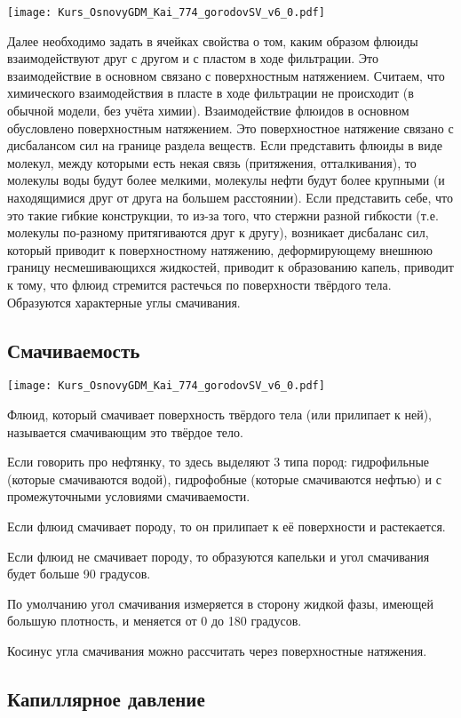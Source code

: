 \documentclass[main.tex]{subfiles}
\begin{document}
\texttt{[image: Kurs\_OsnovyGDM\_Kai\_774\_gorodovSV\_v6\_0.pdf]}

Далее необходимо задать в ячейках свойства о том, каким образом флюиды взаимодействуют друг с другом и с пластом в ходе фильтрации.
Это взаимодействие в основном связано с поверхностным натяжением.
Считаем, что химического взаимодействия в пласте в ходе фильтрации не происходит (в обычной модели, без учёта химии).
Взаимодействие флюидов в основном обусловлено поверхностным натяжением.
Это поверхностное натяжение связано с дисбалансом сил на границе раздела веществ.
Если представить флюиды в виде молекул, между которыми есть некая связь (притяжения, отталкивания), то молекулы воды будут более мелкими, молекулы нефти будут более крупными (и находящимися друг от друга на большем расстоянии).
Если представить себе, что это такие гибкие конструкции, то из-за того, что стержни разной гибкости (т.е. молекулы по-разному притягиваются друг к другу), возникает дисбаланс сил, который приводит к поверхностному натяжению, деформирующему внешнюю границу несмешивающихся жидкостей, приводит к образованию капель, приводит к тому, что флюид стремится растечься по поверхности твёрдого тела.
Образуются характерные углы смачивания.

\subsection{Смачиваемость}

\texttt{[image: Kurs\_OsnovyGDM\_Kai\_774\_gorodovSV\_v6\_0.pdf]}

Флюид, который смачивает поверхность твёрдого тела (или прилипает к ней), называется смачивающим это твёрдое тело.

Если говорить про нефтянку, то здесь выделяют 3 типа пород: гидрофильные (которые смачиваются водой), гидрофобные (которые смачиваются нефтью) и с промежуточными условиями смачиваемости.

Если флюид смачивает породу, то он прилипает к её поверхности и растекается.

Если флюид не смачивает породу, то образуются капельки и угол смачивания будет больше 90 градусов.

По умолчанию угол смачивания измеряется в сторону жидкой фазы, имеющей большую плотность, и меняется от 0 до 180 градусов.

Косинус угла смачивания можно рассчитать через поверхностные натяжения.

\subsection{Капиллярное давление}
\end{document}
